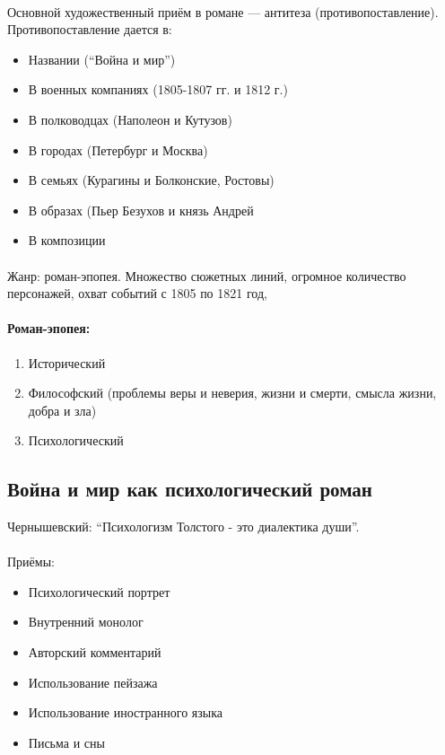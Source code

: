 \documentclass{article}
\begin{document}
\paragraph{}

Основной художественный приём в романе --- антитеза (противопоставление).
Противопоставление дается в:
\begin{itemize}
\item
  Названии (``Война и мир'')
\item
  В военных компаниях (1805-1807 гг. и 1812 г.)
\item
  В полководцах (Наполеон и Кутузов)
\item
  В городах (Петербург и Москва)
\item
  В семьях (Курагины и Болконские, Ростовы)
\item
  В образах (Пьер Безухов и князь Андрей
\item
  В композиции
\end{itemize}
\paragraph{}
Жанр: роман-эпопея. Множество сюжетных линий, огромное количество персонажей, охват событий
с 1805 по 1821 год,

\paragraph{Роман-эпопея:}

\begin{enumerate}
\item
  Исторический
\item
  Философский (проблемы веры и неверия, жизни и смерти, смысла жизни, добра и зла)
\item
  Психологический
\end{enumerate}

\subsection{Война и мир как психологический роман}

Чернышевский: ``Психологизм Толстого - это диалектика души''.
\paragraph{}

Приёмы:

\begin{itemize}
\item
  Психологический портрет
\item
  Внутренний монолог
\item
  Авторский комментарий
\item
  Использование пейзажа
\item
  Использование иностранного языка
\item
  Письма и сны
\end{itemize}
\end{document}
